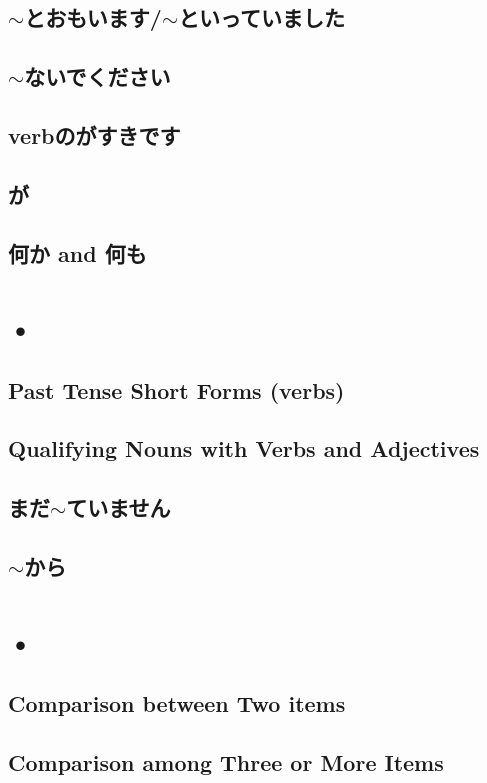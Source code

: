 \documentclass{article}
\begin{document}
   \subsection{$\sim$とおもいます/$\sim$といっていました}
   \subsection{$\sim$ないでください}
   \subsection{verbのがすきです}
   \subsection{が}
   \subsection{何か and 何も}
   
   \newpage
   
   \section{•}
   \subsection{Past Tense Short Forms (verbs)}
   \subsection{Qualifying Nouns with Verbs and Adjectives}
   \subsection{まだ$\sim$ていません}
   \subsection{$\sim$から}
   
   \newpage
   
   \section{•}
   \subsection{Comparison between Two items}
   \subsection{Comparison among Three or More Items}
\end{document}
